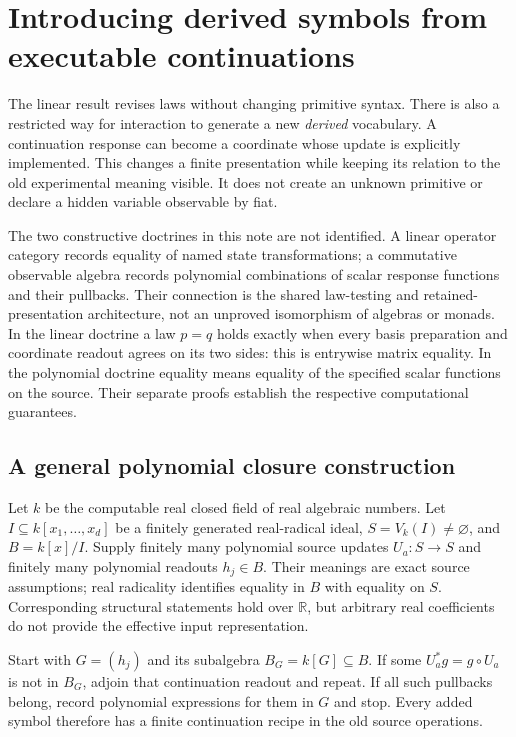 \documentclass[11pt]{article}
\theoremstyle{definition}
\theoremstyle{remark}\newtheorem{remark}[theorem]{Remark}
\newcommand{\R}{\mathbb R}
\begin{document}
\section{Introducing derived symbols from executable continuations}
\label{sec:derived}
The linear result revises laws without changing primitive syntax. There is
also a restricted way for interaction to generate a new \emph{derived}
vocabulary. A continuation response can become a coordinate whose update
is explicitly implemented. This changes a finite presentation while keeping
its relation to the old experimental meaning visible. It does not create
an unknown primitive or declare a hidden variable observable by fiat.

The two constructive doctrines in this note are not identified. A linear
operator category records equality of named state transformations; a
commutative observable algebra records polynomial combinations of scalar
response functions and their pullbacks. Their connection is the shared
law-testing and retained-presentation architecture, not an unproved
isomorphism of algebras or monads. In the linear doctrine a law $p=q$ holds
exactly when every basis preparation and coordinate readout agrees on its
two sides: this is entrywise matrix equality. In the polynomial doctrine
equality means equality of the specified scalar functions on the source.
Their separate proofs establish the respective computational guarantees.


\subsection{A general polynomial closure construction}
Let $k$ be the computable real closed field of real algebraic numbers.
Let $I\subseteq k[x_1,\ldots,x_d]$ be a finitely generated real-radical ideal,
$S=V_k(I)\ne\varnothing$, and $B=k[x]/I$. Supply finitely many polynomial source updates
$U_a:S\to S$ and finitely many polynomial readouts $h_j\in B$. Their meanings are exact
source assumptions; real radicality identifies equality in $B$ with equality
on $S$. Corresponding structural statements hold over $\R$, but arbitrary
real coefficients do not provide the effective input representation.

Start with $G=(h_j)$ and its subalgebra $B_G=k[G]\subseteq B$. If some
$U_a^*g=g\circ U_a$ is not in $B_G$, adjoin that continuation readout and
repeat. If all such pullbacks belong, record polynomial expressions for
them in $G$ and stop. Every added symbol therefore has a finite continuation
recipe in the old source operations.
\end{document}
